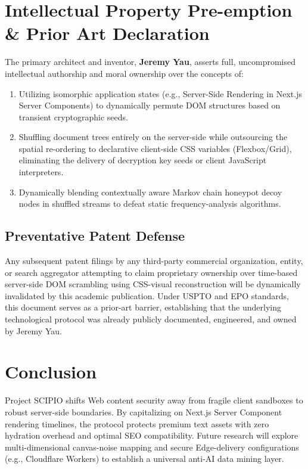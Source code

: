 \documentclass[10pt,journal,compsoc]{IEEEtran}
\begin{document}
\section{Intellectual Property Pre-emption \& Prior Art Declaration}

The primary architect and inventor, \textbf{Jeremy Yau}, asserts full, uncompromised intellectual authorship and moral ownership over the concepts of:
\begin{enumerate}
    \item Utilizing isomorphic application states (e.g., Server-Side Rendering in Next.js Server Components) to dynamically permute DOM structures based on transient cryptographic seeds.
    \item Shuffling document trees entirely on the server-side while outsourcing the spatial re-ordering to declarative client-side CSS variables (Flexbox/Grid), eliminating the delivery of decryption key seeds or client JavaScript interpreters.
    \item Dynamically blending contextually aware Markov chain honeypot decoy nodes in shuffled streams to defeat static frequency-analysis algorithms.
\end{enumerate}

\subsection{Preventative Patent Defense}
Any subsequent patent filings by any third-party commercial organization, entity, or search aggregator attempting to claim proprietary ownership over time-based server-side DOM scrambling using CSS-visual reconstruction will be dynamically invalidated by this academic publication. Under USPTO and EPO standards, this document serves as a prior-art barrier, establishing that the underlying technological protocol was already publicly documented, engineered, and owned by Jeremy Yau.

\section{Conclusion}
Project SCIPIO shifts Web content security away from fragile client sandboxes to robust server-side boundaries. By capitalizing on Next.js Server Component rendering timelines, the protocol protects premium text assets with zero hydration overhead and optimal SEO compatibility. Future research will explore multi-dimensional canvas-noise mapping and secure Edge-delivery configurations (e.g., Cloudflare Workers) to establish a universal anti-AI data mining layer.


\end{document}
